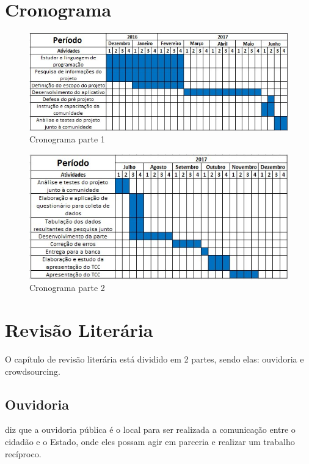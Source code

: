 \documentclass[
	12pt,				%
	openright,			%
	oneside,			%
	a4paper,			%
	english,			%
	french,				%
	spanish,			%
	brazil				%
	]{abntex2}
\begin{document}
\chapter[Cronograma]{Cronograma}

\begin{figure}[!h]
\centering
\caption{Cronograma parte 1}
\includegraphics[width=1.0\linewidth]{imagens/cronograma_parte_1.jpg}
\end{figure}	

\begin{figure}[!h]
	\centering
	\caption{Cronograma parte 2}
	\includegraphics[width=1.0\linewidth]{imagens/cronograma_parte_2.jpg}
\end{figure}	


\chapter[Revisão Literária]{Revisão Literária}


O capítulo de revisão literária está dividido em 2 partes, sendo elas: ouvidoria e crowdsourcing.

\section{Ouvidoria}

\cite{cardoso2010ouvidoria} diz que a ouvidoria pública é o local para ser realizada a comunicação entre o cidadão e o Estado, onde eles possam agir em parceria e realizar um trabalho recíproco. 
\end{document}
